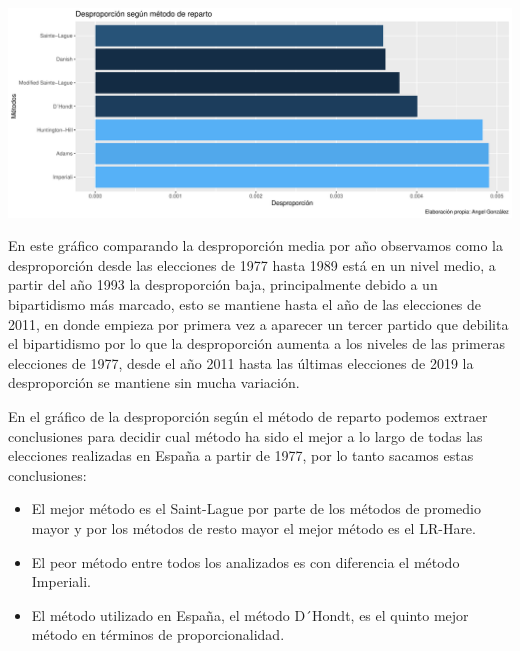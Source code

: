 \documentclass[12pt,a4paper,]{book}
\providecommand{\tightlist}{%
  \setlength{\itemsep}{0pt}\setlength{\parskip}{0pt}}
\numberwithin{dummy}{section}
\theoremstyle{ocrenumbox}
\theoremstyle{blacknumex}
\theoremstyle{blacknumbox}
\theoremstyle{ocrenum}
\theoremstyle{ocrenum}
\begin{document}
\begin{center}\includegraphics[width=1\linewidth]{figurasR/unnamed-chunk-117-2} \end{center}

En este gráfico comparando la desproporción media por año observamos
como la desproporción desde las elecciones de 1977 hasta 1989 está en un
nivel medio, a partir del año 1993 la desproporción baja, principalmente
debido a un bipartidismo más marcado, esto se mantiene hasta el año de
las elecciones de 2011, en donde empieza por primera vez a aparecer un
tercer partido que debilita el bipartidismo por lo que la desproporción
aumenta a los niveles de las primeras elecciones de 1977, desde el año
2011 hasta las últimas elecciones de 2019 la desproporción se mantiene
sin mucha variación.

En el gráfico de la desproporción según el método de reparto podemos
extraer conclusiones para decidir cual método ha sido el mejor a lo
largo de todas las elecciones realizadas en España a partir de 1977, por
lo tanto sacamos estas conclusiones:

\begin{itemize}
\tightlist
\item
  El mejor método es el Saint-Lague por parte de los métodos de promedio
  mayor y por los métodos de resto mayor el mejor método es el LR-Hare.
\item
  El peor método entre todos los analizados es con diferencia el método
  Imperiali.
\item
  El método utilizado en España, el método D´Hondt, es el quinto mejor
  método en términos de proporcionalidad.
\end{itemize}
\end{document}
